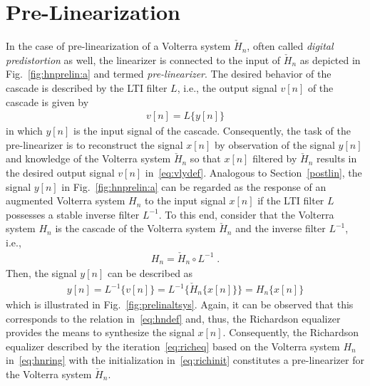 \documentclass[10pt,twocolumn,twoside]{IEEEtran}
\begin{document}
\section{Pre-Linearization}
	\label{prelin}

In the case of pre-linearization of a Volterra system $\check{H}_n$,
often called \emph{digital predistortion} as well, the
linearizer is connected to the input of $\check{H}_n$ as depicted in
Fig.~\ref{fig:hnprelin:a} and termed \emph{pre-linearizer}.
The desired behavior of the cascade is described by the LTI filter $L$,
i.e., the output signal $v[n]$ of the cascade is given by
\begin{align}
	v[n]=L\{y[n]\}
	\label{eq:vlydef}
\end{align}
in which $y[n]$ is the input signal of the cascade. Consequently, the task of the
pre-linearizer is to reconstruct the signal $x[n]$ by observation of the signal $y[n]$ and
knowledge of the Volterra system $\check{H}_n$ so that $x[n]$ filtered by $\check{H}_n$
results in the desired output signal $v[n]$ in~\eqref{eq:vlydef}. Analogous to
Section~\ref{postlin}, the signal $y[n]$ in Fig.~\ref{fig:hnprelin:a} can be regarded
as the response of an augmented Volterra system $H_n$ to the input signal $x[n]$
if the LTI filter $L$ possesses a stable inverse filter $L^{-1}$.
To this end, consider that the Volterra system $H_n$ is the cascade of
the Volterra system $\check{H}_n$ and the inverse filter $L^{-1}$, i.e.,
\begin{align}
	H_n =  \check{H}_n \circ L^{-1}\;.
	\label{eq:hnring}
\end{align}
Then, the signal $y[n]$ can be described as
\begin{align*}
	y[n] = L^{-1}\{v[n]\}
	     = L^{-1}\{\check{H}_n\{x[n]\}\}
	     = H_n\{x[n]\}
\end{align*}
which is illustrated in Fig.~\ref{fig:prelinaltsys}.
Again, it can be observed that this corresponds to the
relation in~\eqref{eq:hndef} and, thus, the Richardson equalizer provides
the means to synthesize the signal $x[n]$. Consequently, the Richardson
equalizer described by the iteration~\eqref{eq:richeq} based on the Volterra
system $H_n$ in~\eqref{eq:hnring} with the initialization in~\eqref{eq:richinit}
constitutes a pre-linearizer for the Volterra system $\check{H}_n$.
\end{document}

